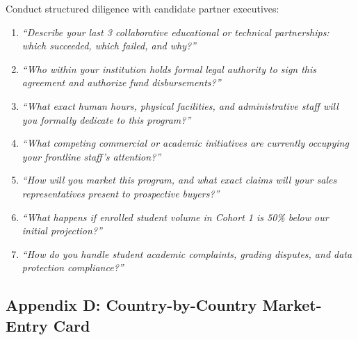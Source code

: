 Conduct structured diligence with candidate partner executives:
\begin{enumerate}
\item \textit{``Describe your last 3 collaborative educational or technical partnerships: which succeeded, which failed, and why?''}
\item \textit{``Who within your institution holds formal legal authority to sign this agreement and authorize fund disbursements?''}
\item \textit{``What exact human hours, physical facilities, and administrative staff will you formally dedicate to this program?''}
\item \textit{``What competing commercial or academic initiatives are currently occupying your frontline staff's attention?''}
\item \textit{``How will you market this program, and what exact claims will your sales representatives present to prospective buyers?''}
\item \textit{``What happens if enrolled student volume in Cohort 1 is 50\% below our initial projection?''}
\item \textit{``How do you handle student academic complaints, grading disputes, and data protection compliance?''}
\end{enumerate}

\subsection*{Appendix D: Country-by-Country Market-Entry Card}
\label{sec:app_country_entry_card}


